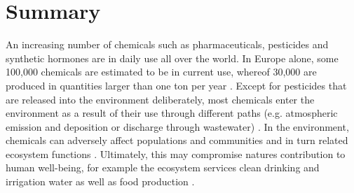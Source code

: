 \documentclass[journal,datadescriptor,submit,moreauthors,pdftex]{Definitions/mdpi}
\begin{document}


\section{Summary}
An increasing number of chemicals such as pharmaceuticals, pesticides and synthetic hormones are in daily use all over the world. In Europe alone, some 100,000 chemicals are estimated to be in current use, whereof 30,000 are produced in quantities larger than one ton per year \citep{breithaupt_costs_2006}. Except for pesticides that are released into the environment deliberately, most chemicals enter the environment as a result of their use through different paths (e.g. atmospheric emission and deposition or discharge through wastewater) \citep{schwarzenbach_challenge_2006}. In the environment, chemicals can adversely affect populations and communities and in turn related ecosystem functions \citep{schafer_thresholds_2012, malaj_organic_2014, hallmann_declines_2014, barracaracciolo_pharmaceuticals_2015, johnston_review_2015}. Ultimately, this may compromise natures contribution to human well-being, for example the ecosystem services clean drinking and irrigation water as well as food production \citep{peters_review_2013, vandersluijs_neonicotinoids_2013, yamamuro_neonicotinoids_2019}. 
\end{document}
